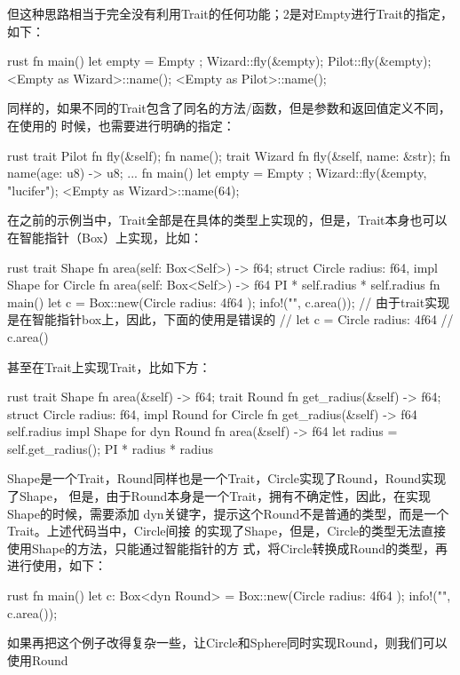 但这种思路相当于完全没有利用Trait的任何功能；2是对Empty进行Trait的指定，如下：
\begin{code-block}{rust}
fn main() {
    let empty = Empty {};
    Wizard::fly(&empty);
    Pilot::fly(&empty);
    <Empty as Wizard>::name();
    <Empty as Pilot>::name();
}
\end{code-block}
同样的，如果不同的Trait包含了同名的方法/函数，但是参数和返回值定义不同，在使用的
时候，也需要进行明确的指定：
\begin{code-block}{rust}
trait Pilot {
    fn fly(&self);
    fn name();
}
trait Wizard {
    fn fly(&self, name: &str);
    fn name(age: u8) -> u8;
}
...
fn main() {
    let empty = Empty {};
    Wizard::fly(&empty, "lucifer");
    <Empty as Wizard>::name(64);
}
\end{code-block}

在之前的示例当中，Trait全部是在具体的类型上实现的，但是，Trait本身也可以在智能指针（Box）上实现，比如：
\begin{code-block}{rust}
trait Shape {
    fn area(self: Box<Self>) -> f64;
}
struct Circle {
    radius: f64,
}
impl Shape for Circle {
    fn area(self: Box<Self>) -> f64 {
        PI * self.radius * self.radius
    }
}
fn main() {
    let c = Box::new(Circle { radius: 4f64 });
    info!("{}", c.area());
    // 由于trait实现是在智能指针box上，因此，下面的使用是错误的
    // let c = Circle { radius: 4f64 }
    // c.area()
}
\end{code-block}
甚至在Trait上实现Trait，比如下方：
\begin{code-block}{rust}
trait Shape {
    fn area(&self) -> f64;
}
trait Round {
    fn get_radius(&self) -> f64;
}
struct Circle {
    radius: f64,
}
impl Round for Circle {
    fn get_radius(&self) -> f64 {
        self.radius
    }
}
impl Shape for dyn Round {
    fn area(&self) -> f64 {
        let radius = self.get_radius();
        PI * radius * radius
    }
}
\end{code-block}
Shape是一个Trait，Round同样也是一个Trait，Circle实现了Round，Round实现了Shape，
但是，由于Round本身是一个Trait，拥有不确定性，因此，在实现Shape的时候，需要添加
dyn关键字，提示这个Round不是普通的类型，而是一个Trait。上述代码当中，Circle间接
的实现了Shape，但是，Circle的类型无法直接使用Shape的方法，只能通过智能指针的方
式，将Circle转换成Round的类型，再进行使用，如下：
\begin{code-block}{rust}
fn main() {
    let c: Box<dyn Round> = Box::new(Circle { radius: 4f64 });
    info!("{}", c.area());
}
\end{code-block}
如果再把这个例子改得复杂一些，让Circle和Sphere同时实现Round，则我们可以使用Round
